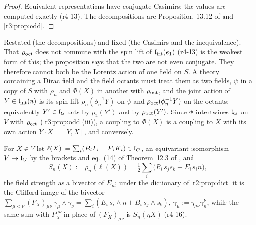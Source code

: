 \begin{proof}
Equivalent representations have conjugate Casimirs; the values are computed exactly (r4-13). The decompositions are Proposition~13.12 of
\cite{ES17} and \cref{r3:prop:odd}.
\end{proof}

Restated (the decompositions) and fixed (the Casimirs and the inequivalence). That $\rho_{\rm oct}$ does not commute with the spin lift of
$\mathfrak l_{\rm int}(e_1)$ (r4-13) is the weakest form of this; the proposition says that the two are not even conjugate. They therefore cannot both be the Lorentz
action of one field on $S$. A theory containing a Dirac field and the field octants must treat them as two fields, $\psi$ in a copy of $S$ with
$\rho_n$ and $\Phi(X)$ in another with $\rho_{\rm oct}$, and the joint action of $Y\in\mathfrak l_{\rm int}(n)$ is its spin lift $\rho_n(\phi_n^{-1}Y)$ on $\psi$ and
$\rho_{\rm oct}(\phi_n^{-1}Y)$ on the octants; equivalently $Y'\in\mathfrak l_G$ acts by $\rho_n(Y')$ and by $\rho_{\rm oct}(Y')$.
Since $\Phi$ intertwines $\mathfrak l_G$ on $V$ with $\rho_{\rm oct}$ (\cref{r3:prop:odd}(iii)), a coupling to $\Phi(X)$ is a coupling to $X$ with its own action
$Y\cdot X=[Y,X]$, and conversely.

For $X\in V$ let $\ell(X):=\sum_i(B_iL_i+E_iK_i)\in\mathfrak l_G$, an equivariant isomorphism $V\to\mathfrak l_G$ by the brackets and eq.~(14) of Theorem~12.3 of
\cite{ES17}, and
\[
S_n(X):=\rho_n(\ell(X))=\tfrac12\sum_i\bigl(B_i\,s_js_k+E_i\,s_in\bigr),
\]
the field strength as a bivector of $E_n$; under the dictionary of \cref{r2:prop:dict} it is the Clifford image of the bivector
$\sum_{\mu<\nu}(F_X)_{\mu\nu}\,\gamma_\mu\wedge\gamma_\nu=\sum_i(E_i\,s_i\wedge n+B_i\,s_j\wedge s_k)$, $\gamma_\mu:=\eta_{\mu\nu}\gamma^\nu_n$, while the same sum
with $F_X^{\mu\nu}$ in place of $(F_X)_{\mu\nu}$ is $S_n(\eta X)$ (r4-16).

